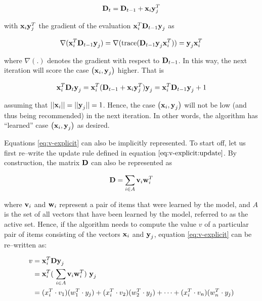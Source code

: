 \begin{equation} \label{eq:v-explicit:update}
    \boldsymbol{\mathbf{D}}_t = \boldsymbol{\mathbf{D}}_{t-1} + \boldsymbol{\mathbf{x}}_{i} \boldsymbol{\mathbf{y}}_{j}^T
\end{equation}

with $\boldsymbol{\mathbf{x}}_{i} \boldsymbol{\mathbf{y}}_{j}^T$ the gradient of the evaluation $\boldsymbol{\mathbf{x}}_i^T\boldsymbol{\mathbf{D}}_{t-1} \boldsymbol{\mathbf{y}}_j$ as 

\begin{equation} \nonumber
    \nabla (\boldsymbol{\mathbf{x}}_{i}^T\boldsymbol{\mathbf{D}}_{t-1} \boldsymbol{\mathbf{y}}_j) = \nabla (\text{trace}(\boldsymbol{\mathbf{D}}_{t-1} \boldsymbol{\mathbf{y}}_j \boldsymbol{\mathbf{x}}_i^T)) = \boldsymbol{\mathbf{y}}_j \boldsymbol{\mathbf{x}}_i^T
\end{equation}

where $\nabla(.)$ denotes the gradient with respect to $\boldsymbol{\mathbf{D}}_{t-1}$. In this way, the next iteration will score the case $\left( \boldsymbol{\mathbf{x}}_i, \boldsymbol{\mathbf{y}}_j \right)$ higher. That is

\begin{equation} \nonumber
    \boldsymbol{\mathbf{x}}_i^T \boldsymbol{\mathbf{D}}_t \boldsymbol{\mathbf{y}}_j = \boldsymbol{\mathbf{x}}_i^T(\boldsymbol{\mathbf{D}}_{t-1} + \boldsymbol{\mathbf{x}}_i \boldsymbol{\mathbf{y}}_j^T) \boldsymbol{\mathbf{y}}_j = \boldsymbol{\mathbf{x}}_i^T \boldsymbol{\mathbf{D}}_{t-1} \boldsymbol{\mathbf{y}}_j + 1
\end{equation}

assuming that $||\boldsymbol{\mathbf{x}}_i ||=||\boldsymbol{\mathbf{y}}_j ||=1$. Hence, the case $\left( \boldsymbol{\mathbf{x}}_i, \boldsymbol{\mathbf{y}}_j \right)$ will not be low (and thus being recommended) in the next iteration. In other words, the algorithm has ``learned'' case $\left( \boldsymbol{\mathbf{x}}_i, \boldsymbol{\mathbf{y}}_j \right)$ as desired. \newline

Equations \ref{eq:v-explicit} can also be implicitly represented. To start off, let us first re--write the update rule defined in equation $\ref{eq:v-explicit:update}$. By construction, the matrix $\boldsymbol{\mathbf{D}}$ can also be represented as

\begin{equation} \nonumber
    \boldsymbol{\mathbf{D}} = \sum_{i \in A} \boldsymbol{\mathbf{v}}_i \boldsymbol{\mathbf{w}}_i^T
\end{equation}

where $\boldsymbol{\mathbf{v}}_i$ and $\boldsymbol{\mathbf{w}}_i$ represent a pair of items that were learned by the model, and $A$ is the set of all vectors that have been learned by the model, referred to as the active set. Hence, if the algorithm needs to compute the value $v$ of a particular pair of items consisting of the vectors $\boldsymbol{\mathbf{x}}_i$ and $\boldsymbol{\mathbf{y}}_j$, equation \ref{eq:v-explicit} can be re--written as:

\begin{equation} \label{eq:v-implicit}
    \begin{split}
        v &= \vect{x}_i^T \vect{D} \vect{y}_j \\
        &= \vect{x}_i^T (\ \sum_{i \in A} \vect{v}_i \vect{w}_i^T )\ \vect{y}_j \\
        &= ( x_i^T \cdot v_1 )  ( w_1^T \cdot y_j ) + ( x_i^T \cdot v_2 ) ( w_2^T  \cdot y_j ) + \cdots + ( x_i^T \cdot v_n )  ( w_n^T \cdot y_j ) \\
    \end{split}
\end{equation}


